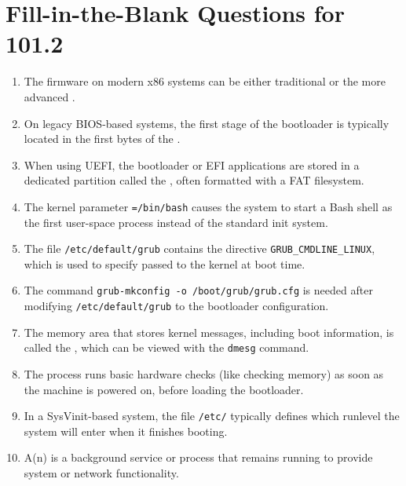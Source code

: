 \documentclass[a4paper]{report}
\begin{document}
  
  \newpage
  \section*{Fill-in-the-Blank Questions for 101.2}
  
  \begin{enumerate}[1.]
    \item The firmware on modern x86 systems can be either traditional \underline{\hspace{2cm}} or the more advanced \underline{\hspace{2cm}}.
    \item On legacy BIOS-based systems, the first stage of the bootloader is typically located in the first \underline{\hspace{2cm}} bytes of the \underline{\hspace{2cm}}.
    \item When using UEFI, the bootloader or EFI applications are stored in a dedicated partition called the \underline{\hspace{2cm}}, often formatted with a FAT filesystem.
    \item The kernel parameter \texttt{\underline{\hspace{2cm}}=/bin/bash} causes the system to start a Bash shell as the first user-space process instead of the standard init system.
    \item The file \texttt{/etc/default/grub} contains the directive \texttt{GRUB\_CMDLINE\_LINUX}, which is used to specify \underline{\hspace{2cm}} passed to the kernel at boot time.
    \item The command \texttt{grub-mkconfig -o /boot/grub/grub.cfg} is needed after modifying \texttt{/etc/default/grub} to \underline{\hspace{2cm}} the bootloader configuration.
    \item The memory area that stores kernel messages, including boot information, is called the \underline{\hspace{2cm}}, which can be viewed with the \texttt{dmesg} command.
    \item The \underline{\hspace{2cm}} process runs basic hardware checks (like checking memory) as soon as the machine is powered on, before loading the bootloader.
    \item In a SysVinit-based system, the file \texttt{/etc/\underline{\hspace{2cm}}} typically defines which runlevel the system will enter when it finishes booting.
    \item A(n) \underline{\hspace{2cm}} is a background service or process that remains running to provide system or network functionality.
\end{enumerate}
\newpage
\end{document}
